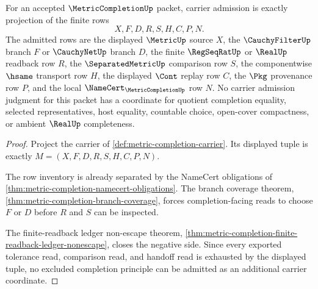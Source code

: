 \begin{theorem}
\label{thm:metric-completion-carrier-admission}
For an accepted $\MetricCompletionUp$ packet, carrier admission is exactly projection of the finite rows
$$
X,F,D,R,S,H,C,P,N .
$$
The admitted rows are the displayed $\MetricUp$ source $X$, the $\CauchyFilterUp$ branch $F$ or $\CauchyNetUp$ branch $D$, the finite $\RegSeqRatUp$ or $\RealUp$ readback row $R$, the $\SeparatedMetricUp$ comparison row $S$, the componentwise $\hsame$ transport row $H$, the displayed $\Cont$ replay row $C$, the $\Pkg$ provenance row $P$, and the local $\NameCert_{\MetricCompletionUp}$ row $N$. No carrier admission judgment for this packet has a coordinate for quotient completion equality, selected representatives, host equality, countable choice, open-cover compactness, or ambient $\RealUp$ completeness.
\end{theorem}
\begin{proof}
Project the carrier of \autoref{def:metric-completion-carrier}. Its displayed tuple is exactly $M=(X,F,D,R,S,H,C,P,N)$.

The row inventory is already separated by the NameCert obligations of \autoref{thm:metric-completion-namecert-obligations}. The branch coverage theorem, \autoref{thm:metric-completion-branch-coverage}, forces completion-facing reads to choose $F$ or $D$ before $R$ and $S$ can be inspected.

The finite-readback ledger non-escape theorem, \autoref{thm:metric-completion-finite-readback-ledger-nonescape}, closes the negative side. Since every exported tolerance read, comparison read, and handoff read is exhausted by the displayed tuple, no excluded completion principle can be admitted as an additional carrier coordinate.
\end{proof}

